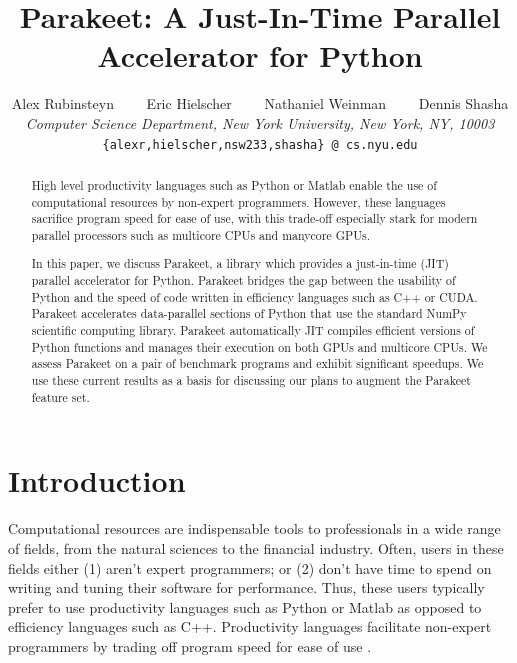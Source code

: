 \documentclass[10pt,twocolumn]{article}
\begin{document}
\title{Parakeet: A Just-In-Time Parallel Accelerator for Python}
\author{
Alex Rubinsteyn \ \ \ \ Eric Hielscher \ \ \ \ Nathaniel Weinman \ \ \ \
Dennis Shasha \\
{\it Computer Science Department, New York University, New York, NY, 10003} \\
\small{\tt \{alexr,hielscher,nsw233,shasha\} @ cs.nyu.edu}
}
\date{}

\newcommand{\MAP}{\impfnt{map}}
\newcommand{\REDUCE}{\impfnt{reduce}}
\newcommand{\SCAN}{\impfnt{scan}}
\newcommand{\ALLPAIRS}{\impfnt{allpairs}}
\newcommand{\concat}{\ensuremath{+\!\!\!\!+\,}}

\setlength\fboxsep{8pt}
\setlength\fboxrule{0.5pt}

\maketitle

\begin{abstract}
High level productivity languages such as Python or Matlab enable the use of computational resources by non-expert programmers.  However, these languages sacrifice program speed for ease of use, with this trade-off especially stark for modern parallel processors such as multicore CPUs and manycore GPUs.

In this paper, we discuss Parakeet, a library which provides a just-in-time (JIT) parallel accelerator for Python.  Parakeet bridges the gap between the usability of Python and the speed of code written in efficiency languages such as C++ or CUDA.  Parakeet accelerates data-parallel sections of Python that use the standard NumPy scientific computing library.  Parakeet automatically JIT compiles efficient versions of Python functions and manages their execution on both GPUs and multicore CPUs.  We assess Parakeet on a pair of benchmark programs and exhibit significant speedups.  We use these current results as a basis for discussing our plans to augment the Parakeet feature set.
\end{abstract}

\section{Introduction}
\label{Intro}

Computational resources are indispensable tools to professionals in a wide range of fields, from the natural sciences to the financial industry.  Often, users in these fields either (1) aren't expert programmers; or (2) don't have time to spend on writing and tuning their software for performance.  Thus, these users typically prefer to use productivity languages such as Python or Matlab as opposed to efficiency languages such as C++.  Productivity languages facilitate non-expert programmers by trading off program speed for ease of use \cite{Pre03}.
\end{document}
